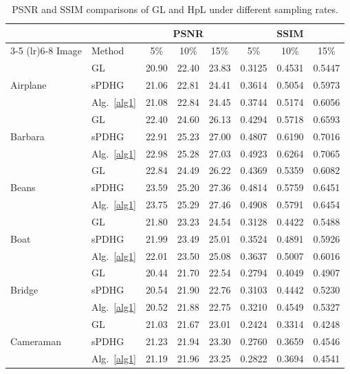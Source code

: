 \documentclass{article}
\theoremstyle{definition}
\begin{document}
\begin{table}[htbp]
\centering
\scriptsize
\setlength{\tabcolsep}{9pt}
\renewcommand{\arraystretch}{0.9}
\caption{PSNR and SSIM comparisons of GL and HpL under different sampling rates.}
\label{table:PSNR}
\begin{tabular}{llcccccc}
\toprule
 &  & \multicolumn{3}{c}{PSNR} & \multicolumn{3}{c}{SSIM} \\
\cmidrule(lr){3-5} \cmidrule(lr){6-8}
Image & Method & 5\% & 10\% & 15\% & 5\% & 10\% & 15\% \\
\midrule
\multirow{3}{*}{Airplane}
& GL & 20.90 & 22.40 & 23.83 & 0.3125 & 0.4531 & 0.5447 \\
& sPDHG & 21.06 & 22.81 & 24.41 & 0.3614 & 0.5054 & 0.5973 \\
& Alg.~\ref{alg1} & 21.08 & 22.84 & 24.45 & 0.3744 & 0.5174 & 0.6056 \\
\midrule
\multirow{3}{*}{Barbara}
& GL & 22.40 & 24.60 & 26.13 & 0.4294 & 0.5718 & 0.6593 \\
& sPDHG & 22.91 & 25.23 & 27.00 & 0.4807 & 0.6190 & 0.7016 \\
& Alg.~\ref{alg1} & 22.98 & 25.28 & 27.03 & 0.4923 & 0.6264 & 0.7065 \\
\midrule
\multirow{3}{*}{Beans}
& GL & 22.84 & 24.49 & 26.22 & 0.4369 & 0.5359 & 0.6082 \\
& sPDHG & 23.59 & 25.20 & 27.36 & 0.4814 & 0.5759 & 0.6451 \\
& Alg.~\ref{alg1} & 23.75 & 25.29 & 27.46 & 0.4908 & 0.5791 & 0.6454 \\
\midrule
\multirow{3}{*}{Boat}
& GL & 21.80 & 23.23 & 24.54 & 0.3128 & 0.4422 & 0.5488 \\
& sPDHG & 21.99 & 23.49 & 25.01 & 0.3524 & 0.4891 & 0.5926 \\
& Alg.~\ref{alg1} & 22.01 & 23.50 & 25.08 & 0.3637 & 0.5007 & 0.6016 \\
\midrule
\multirow{3}{*}{Bridge}
& GL & 20.44 & 21.70 & 22.54 & 0.2794 & 0.4049 & 0.4907 \\
& sPDHG & 20.54 & 21.90 & 22.76 & 0.3103 & 0.4442 & 0.5230 \\
& Alg.~\ref{alg1} & 20.52 & 21.88 & 22.75 & 0.3210 & 0.4549 & 0.5327 \\
\midrule
\multirow{3}{*}{Cameraman}
& GL & 21.03 & 21.67 & 23.01 & 0.2424 & 0.3314 & 0.4248 \\
& sPDHG & 21.23 & 21.94 & 23.30 & 0.2760 & 0.3659 & 0.4546 \\
& Alg.~\ref{alg1} & 21.19 & 21.96 & 23.25 & 0.2822 & 0.3694 & 0.4541 \\

\end{tabular}
\end{table}
\end{document}
